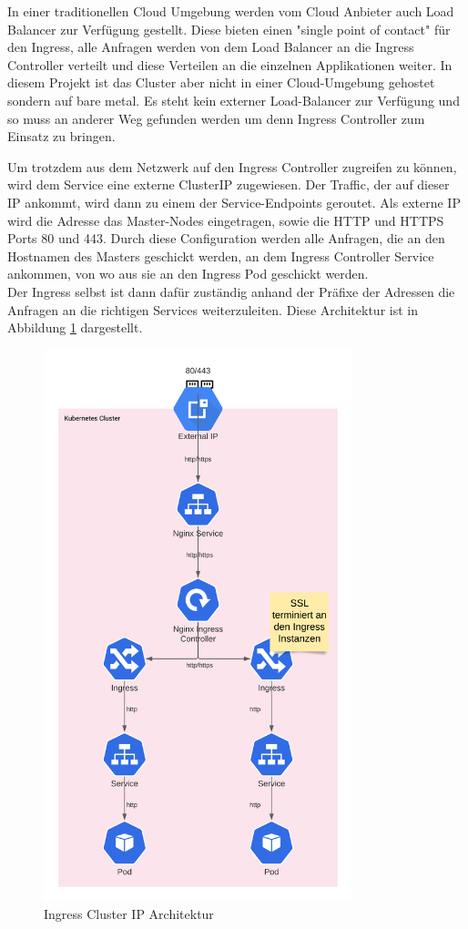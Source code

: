 In einer traditionellen Cloud Umgebung werden vom Cloud Anbieter auch Load Balancer zur Verfügung gestellt. 
Diese bieten einen "single point of contact" für den Ingress, alle Anfragen werden von dem Load Balancer an die Ingress Controller verteilt und diese Verteilen an die einzelnen Applikationen weiter.
In diesem Projekt ist das Cluster aber nicht in einer Cloud-Umgebung gehostet sondern auf bare metal.
Es steht kein externer Load-Balancer zur Verfügung und so muss an anderer Weg gefunden werden um denn Ingress Controller zum Einsatz zu bringen. 

Um trotzdem aus dem Netzwerk auf den Ingress Controller zugreifen zu können, wird dem Service eine externe ClusterIP zugewiesen.
Der Traffic, der auf dieser \ac{IP} ankommt, wird dann zu einem der Service-Endpoints geroutet.
Als externe \ac{IP} wird die Adresse das Master-Nodes eingetragen, sowie die \ac{HTTP} und \ac{HTTPS} Ports 80 und 443.
Durch diese Configuration werden alle Anfragen, die an den Hostnamen des Masters geschickt werden, an dem Ingress Controller Service ankommen, von wo aus sie an den Ingress Pod geschickt werden.
\\
Der Ingress selbst ist dann dafür zuständig anhand der Präfixe der Adressen die Anfragen an die richtigen Services weiterzuleiten.
Diese Architektur ist in Abbildung \ref{fig:clusterip} dargestellt.
\begin{figure}[h!]
    \centering
    \includegraphics[width=0.8\textwidth]{bilder/ClusterIP.png}
    \caption{Ingress Cluster IP Architektur}
    \label{fig:clusterip}
\end{figure}
